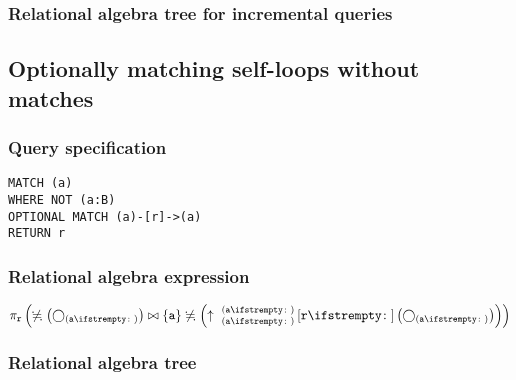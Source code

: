 \subsubsection*{Relational algebra tree for incremental queries}


\subsection{Optionally matching self-loops without matches}

\subsubsection*{Query specification}

\begin{lstlisting}
MATCH (a)
WHERE NOT (a:B)
OPTIONAL MATCH (a)-[r]->(a)
RETURN r
\end{lstlisting}

\subsubsection*{Relational algebra expression}

$\projection{\var{r}} \left(\alldifferent{} \left(\getvertices{a}{}\right) \join \{\var{a}\} \alldifferent{} \left(\expandout{a}{a}{}{r}{} \left(\getvertices{a}{}\right)\right)\right)$

\subsubsection*{Relational algebra tree}


